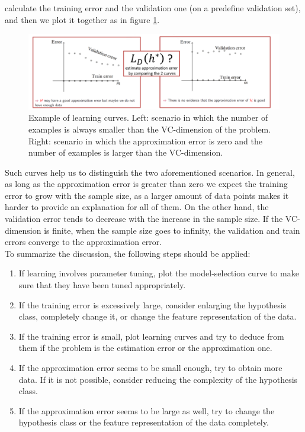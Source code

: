 \documentclass[12pt]{report}
\theoremstyle{plain}
\begin{document}
\begin{flushleft}
calculate the training error and the validation one (on a predefine validation 
set), and then we plot it together as in figure \ref{fig:learning_curves}.
\begin{figure}[!h]
	\centering
	\includegraphics[scale=0.7]{images/learning_curves.pdf}
	\caption{Example of learning curves. Left: scenario in which the number of 
	examples is always smaller than the VC-dimension of the problem. Right: 
	scenario in which the approximation error is zero and the number of 
	examples is larger than the VC-dimension.}
	\label{fig:learning_curves}
\end{figure}
Such curves help us to distinguish the two aforementioned scenarios. In 
general, as long as the approximation error is greater than zero we expect the 
training error to grow with the sample size, as a larger amount of data points 
makes it harder to provide an explanation for all of them. On the other hand, 
the validation error tends to decrease with the increase in the sample size. If 
the VC-dimension is finite, when the sample size goes to infinity, the 
validation and train errors converge to the approximation error.\\

To summarize the discussion, the following steps should be applied:
\begin{enumerate}
	\item If learning involves parameter tuning, plot the model-selection curve 
	to make sure that they have been tuned appropriately.
	\item If the training error is excessively large, consider enlarging the 
	hypothesis class, completely change it, or change the feature 
	representation of the data.
	\item If the training error is small, plot learning curves and try to 
	deduce from them if the problem is the estimation error or the 
	approximation one.
	\item If the approximation error seems to be small enough, try to obtain 
	more data. If it is not possible, consider reducing the complexity of the 
	hypothesis class.
	\item If the approximation error seems to be large as well, try to change 
	the hypothesis class or the feature representation of the data completely.
\end{enumerate}



\end{flushleft}
\end{document}
